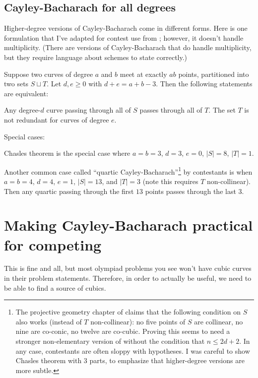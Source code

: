 \documentclass[11pt]{scrartcl}
\begin{document}
\subsection{Cayley-Bacharach for all degrees}
Higher-degree versions of Cayley-Bacharach come in different forms.
Here is one formulation that I've adapted for contest use from \cite[Theorem CB5]{EGH};
however, it doesn't handle multiplicity.
(There are versions of Cayley-Bacharach that do handle multiplicity,
but they require language about schemes to state correctly.)
\begin{theorem}
  Suppose two curves of degree $a$ and $b$ meet at exactly $ab$ points,
  partitioned into two sets $S \sqcup T$.
  Let $d,e \ge 0$ with $d+e = a+b-3$.
  Then the following statements are equivalent:
  \begin{enumerate}[(i)]
    \itemsep1pt
    \ii Any degree-$d$ curve passing through all of $S$ passes through all of $T$.
    \ii The set $T$ is not redundant for curves of degree $e$.
  \end{enumerate}
\end{theorem}
\noindent Special cases:
\begin{itemize}
  \itemsep1pt
  \ii Chasles theorem is the special case where $a=b=3$, $d=3$, $e=0$, $|S|=8$, $|T|=1$.

  \ii Another common case called ``\alert{quartic Cayley-Bacharach}''\footnote{The
    projective geometry chapter of \cite{MODA}
    claims that the following condition on $S$ also works
    (instead of $T$ non-collinear):
    no five points of $S$ are collinear,
    no nine are co-conic, no twelve are co-cubic.
    Proving this seems to need a stronger non-elementary version
    of  without the condition that $n \le 2d+2$.
    In any case, contestants are often sloppy with hypotheses.
    I was careful to show Chasles theorem with 3 parts,
    to emphasize that higher-degree versions are more subtle.}
  by contestants is when $a=b=4$,
  $d=4$, $e=1$, $|S|=13$, and $|T|=3$ (note this requires $T$ non-collinear).
  Then any quartic passing through the first $13$ points passes through the last $3$.
\end{itemize}

\section{Making Cayley-Bacharach practical for competing}
This is fine and all, but most olympiad problems you see won't have cubic curves
in their problem statements.
Therefore, in order to actually be useful, we need to be able to find a source of cubics.
\end{document}
